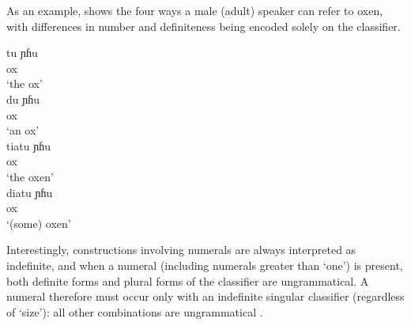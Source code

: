 \documentclass[output=paper
,modfonts
,nonflat]{langsci/langscibook}
\begin{document}
\begin{table}[h]
\caption{Inflection of \textit{tu}\label{WAClPara}}
\end{table}

As an example,  shows the four ways a male (adult) speaker can  refer to oxen, with differences in number and definiteness being encoded solely on the classifier.

\ea \label{ex:hall:24}

\ea
\gll
tu ɲɦu\\
{} ox\\
\glt
`the ox'\\

\ex
\gll
du ɲɦu\\
{} ox\\
\glt
`an ox'\\

\ex 
\gll
tiatu ɲɦu\\
{} ox\\
\glt
`the oxen'\\

\ex 
\gll
diatu ɲɦu\\
{} ox\\
\glt
`(some) oxen'\\
\z
\z

Interestingly, constructions involving numerals are always interpreted as indefinite, and when a numeral (including numerals greater than `one') is present, both definite forms and plural forms of the classifier are ungrammatical. A numeral therefore must occur only with an indefinite singular classifier (regardless of `size'): all other combinations are ungrammatical \citep[588]{GernerBisang2010}.
\end{document}

